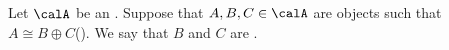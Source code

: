 \begin{definition} \label{definition:direct_summand_of_an_object_in_an_additive_category}
    Let $\calA$ be an .
    Suppose that $A,B,C \in \calA$ are objects such that $A \cong B \oplus C$(). We say that $B$ and $C$ are .
\end{definition}